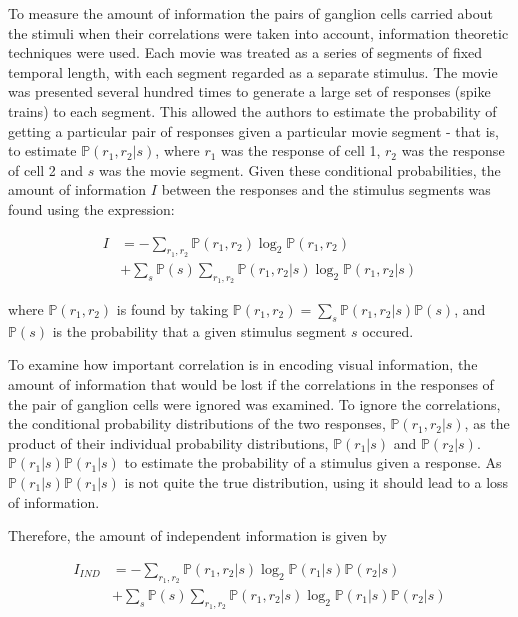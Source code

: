 \documentclass[twoside]{article}
\begin{document}
\begin{multicols}{2}
To measure the amount of information the pairs of ganglion cells carried about the stimuli when their correlations were taken into account, information theoretic techniques were used. Each movie was treated as a series of segments of fixed temporal length, with each segment regarded as a separate stimulus. The movie was presented several hundred times to generate a large set of responses (spike trains) to each segment. This allowed the authors to estimate the probability of getting a particular pair of responses given a particular movie segment - that is, to estimate $\mathbb{P}(r_1,r_2|s)$, where $r_1$ was the response of cell 1, $r_2$ was the response of cell 2 and $s$ was the movie segment. Given these conditional probabilities, the amount of information $I$ between the responses and the stimulus segments was found using the expression:


\begin{align}\label{eq:info-theory}
	I 
		&= -\sum_{r_1,r_2}\mathbb{P}(r_1,r_2)\log_2\mathbb{P}(r_1,r_2) \\
  		&+ \sum_s\mathbb{P}(s) \sum_{r_1,r_2}\mathbb{P}(r_1,r_2|s)\log_2\mathbb{P}(r_1,r_2|s)
\end{align}


where $\mathbb{P}(r_1,r_2)$ is found by taking $\mathbb{P}(r_1,r_2) = \sum_s \mathbb{P}(r_1,r_2|s)\mathbb{P}(s)$, and $\mathbb{P}(s)$ is the probability that a given stimulus segment $s$ occured. 

To examine how important correlation is in encoding visual information, the amount of information that would be lost if the correlations in the responses of the pair of ganglion cells were ignored was examined. To ignore the correlations, the conditional probability distributions of the two responses, $\mathbb{P}(r_1,r_2|s)$, as the product of their individual probability distributions, $\mathbb{P}(r_1|s)$ and $\mathbb{P}(r_2|s)$. $\mathbb{P}(r_1|s)\mathbb{P}(r_1|s)$ to estimate the probability of a stimulus given a response. As $\mathbb{P}(r_1|s)\mathbb{P}(r_1|s)$ is not quite the true distribution, using it should lead to a loss of information. 

Therefore, the amount of independent information is given by

\begin{align}
	I_{IND} 
		&= -\sum_{r_1,r_2}\mathbb{P}(r_1,r_2|s)\log_2\mathbb{P}(r_1|s)\mathbb{P}(r_2|s) \\
		&+ \sum_s\mathbb{P}(s) \sum_{r_1,r_2}\mathbb{P}(r_1,r_2|s)\log_2\mathbb{P}(r_1|s)\mathbb{P}(r_2|s) 
\end{align}


\end{multicols}
\end{document}
